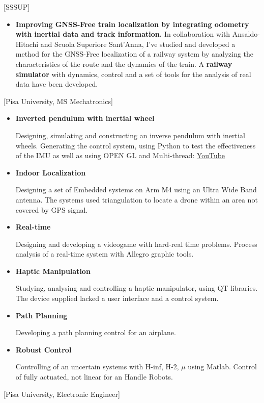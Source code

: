 \documentclass{article}
\begin{document}
[SSSUP]
\begin{itemize}
    \item \textbf{Improving GNSS-Free train localization by integrating odometry with inertial data and track information.}
    \newline
In collaboration with Ansaldo-Hitachi and Scuola Superiore Sant’Anna, I’ve studied and developed a method for the GNSS-Free localization of a railway system by analyzing the characteristics of the route and the dynamics of the train. A \textbf{railway simulator} with dynamics, control and a set of tools for the analysis of real data have been developed.
\end{itemize}

[Pisa University, MS Mechatronics]
\begin{itemize}
\item \textbf{Inverted pendulum with inertial wheel}

Designing, simulating and constructing an inverse pendulum with inertial wheels. Generating the control system, using Python to test the effectiveness of the IMU as well as using OPEN GL and Multi-thread: \href{https://www.youtube.com/watch?v=wL0Aum5eXEo}{YouTube}

\item \textbf{Indoor Localization}

Designing a set of Embedded systems on Arm M4 using an Ultra Wide Band antenna. The systems used triangulation to locate a drone within an area not covered by GPS signal.

\item \textbf{Real-time}

Designing and developing a videogame with hard-real time problems. Process analysis of a real-time system with Allegro graphic tools.

\item \textbf{Haptic Manipulation}

Studying, analysing and controlling a haptic manipulator, using QT libraries. The device supplied lacked a user interface and a control system.

\item \textbf{Path Planning}

Developing a path planning control for an airplane.

\item \textbf{Robust Control}

Controlling of an uncertain systems with H-inf, H-2, $\mu$ using Matlab. Control of fully actuated, not linear for an Handle Robots.

\end{itemize}
[Pisa University, Electronic Engineer]
\end{document}
